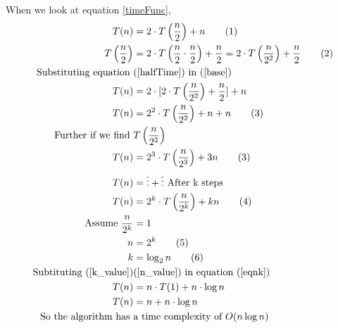 \documentclass[]{article}
\theoremstyle{plain}
\theoremstyle{definition}
\begin{document}
When we look at equation \ref{timeFunc}, 
\begin{align*}
    T(n) &= 2\cdot T\left(\frac{n}{2}\right) + n \tag{1} \label{base}\\ 
    T\left(\frac{n}{2}\right) &= 2\cdot T\left(\frac{n}{2} \cdot \frac{n}{2}\right) + \frac{n}{2} = 2\cdot T\left(\frac{n}{2^2}\right) + \frac{n}{2} \tag{2} \label{halfTime}
    \\
    \text {Substituting equation } &\text{(\ref{halfTime}) in (\ref{base})}\\
    T(n) &= 2\cdot [2\cdot T\left(\frac{n}{2^2}\right) + \frac{n}{2} ] + n\\
    T(n) &= 2^2\cdot T\left(\frac{n}{2^2}\right) + n  + n \tag{3} \label{eqn2}\\
    \text{Further if we find } &T\left(\frac{n}{2^2}\right)\\
    T(n) &= 2^3\cdot T\left(\frac{n}{2^3}\right) + 3n \tag{3} \label{eqn2}\\
    T(n) &= \vdots  + \vdots \text { After k steps} \\ 
    T(n) &= 2^k \cdot T\left(\frac{n}{2^k}\right) + kn \tag{4} \label{eqnk}\\
    \text{Assume } \frac{n}{2^k} &= 1\\
    n &= 2^k \tag{5} \label{n_value}\\ 
    k &= \log_2{n} \tag{6} \label{k_value} \\
    \text{Subtituting  (\ref{k_value})}& \text{(\ref{n_value}) in equation (\ref{eqnk})}\\
    T(n) &= n \cdot T(1) + n\cdot \log{n}\\
    T(n) &= n + n\cdot \log{n}\\
    \text{So the algorithm has } &\text{a time complexity of } O(n\log n)
\end{align*}
\end{document}
